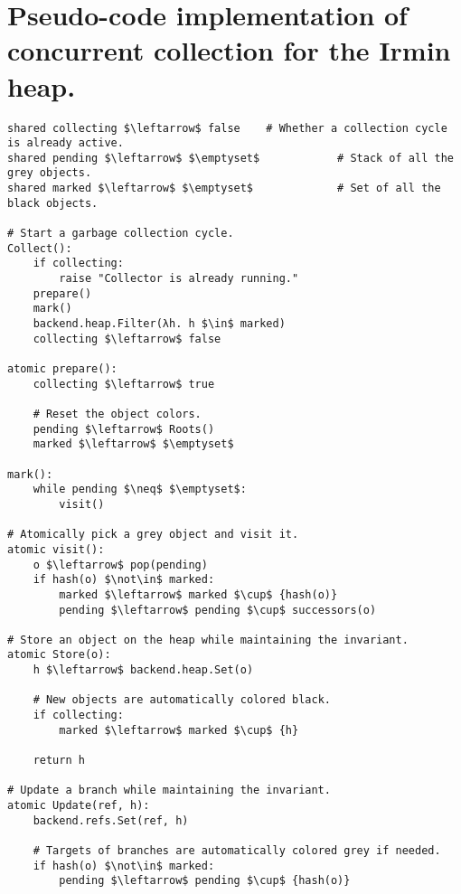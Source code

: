 \section{Pseudo-code implementation of concurrent collection for the Irmin heap.}
\label{app:concurrent-collection}

\centering
\begin{lstlisting}
shared collecting $\leftarrow$ false    # Whether a collection cycle is already active.
shared pending $\leftarrow$ $\emptyset$            # Stack of all the grey objects.
shared marked $\leftarrow$ $\emptyset$             # Set of all the black objects.

# Start a garbage collection cycle.
Collect():
    if collecting:
        raise "Collector is already running."
    prepare()
    mark()
    backend.heap.Filter(λh. h $\in$ marked)
    collecting $\leftarrow$ false

atomic prepare():
    collecting $\leftarrow$ true

    # Reset the object colors.
    pending $\leftarrow$ Roots()
    marked $\leftarrow$ $\emptyset$

mark():
    while pending $\neq$ $\emptyset$:
        visit()

# Atomically pick a grey object and visit it.
atomic visit():
    o $\leftarrow$ pop(pending)
    if hash(o) $\not\in$ marked:
        marked $\leftarrow$ marked $\cup$ {hash(o)}
        pending $\leftarrow$ pending $\cup$ successors(o)

# Store an object on the heap while maintaining the invariant.
atomic Store(o):
    h $\leftarrow$ backend.heap.Set(o)

    # New objects are automatically colored black.
    if collecting:
        marked $\leftarrow$ marked $\cup$ {h}

    return h

# Update a branch while maintaining the invariant.
atomic Update(ref, h):
    backend.refs.Set(ref, h)

    # Targets of branches are automatically colored grey if needed.
    if hash(o) $\not\in$ marked:
        pending $\leftarrow$ pending $\cup$ {hash(o)}
\end{lstlisting}